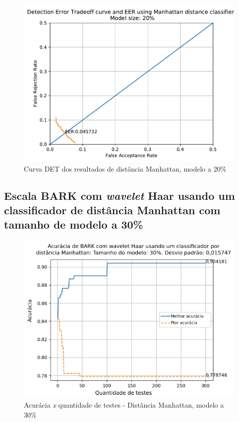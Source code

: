 			\begin{figure}[!h]
				\centering
				\includegraphics[width=.6\linewidth]{images/results/det/DET_for_classifier_Manhattan_20}
				\caption{Curva DET dos resultados de distância Manhattan, modelo a 20\%}
				\label{fig:detforclassifiermanhattan20}
			\end{figure}
	
			\FloatBarrier
		\subsection{Escala BARK com \textit{wavelet} Haar usando um classificador de distância Manhattan com tamanho de modelo a 30\%}
		
			
			
			\begin{figure}[ht]
				\centering
				\includegraphics[width=.6\linewidth]{images/results/confusionMatrices/classifier_Manhattan_30.png}
				\caption{Acurácia \textit{x} quantidade de testes - Distância Manhattan, modelo a 30\%}
				\label{fig:classifiermanhattan30}
			\end{figure}
		
